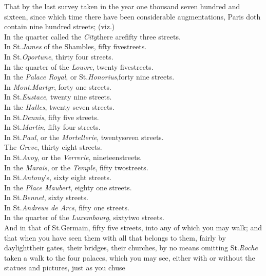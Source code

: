 \documentclass{article}
\begin{document}
\def\bnq{\break\null\quad}
That by the last survey taken in the year one thousand seven
hundred and sixteen, since which time there have been considerable
augmentations, Paris doth contain nine hundred streets;
(viz.)\\[2pt]
In the quarter called the \textit{City}\tsk there are\break\null\quad fifty three streets.\\
In St.\@ \textit{James} of the Shambles, fifty five\break\null\quad streets.\\
In St.\@ \textit{Oportune}, thirty four streets.\\
In the quarter of the \textit{Louvre}, twenty five\break\null\quad streets.\\
In the \textit{Palace Royal}, or St.\@ \textit{Honorius},\break\null\quad forty nine streets.\\
In \textit{Mont.\@ Martyr}, forty one streets.\\
In St.\@ \textit{Eustace}, twenty nine streets.\\
\newpage\noindent
In the \textit{Halles}, twenty seven streets.\\
In St.\@ \textit{Dennis}, fifty five streets.\\
In St.\@ \textit{Martin}, fifty four streets.\\
In St.\@ \textit{Paul}, or the \textit{Mortellerie}, twenty\bnq seven streets.\\
The \textit{Greve}, thirty eight streets.\\
In St.\@ \textit{Avoy}, or the \textit{Verrerie}, nineteen\bnq streets.\\
In the \textit{Marais}, or the \textit{Temple}, fifty two\bnq streets.\\
In St.\@ \textit{Antony}’s, sixty eight streets.\\
In the \textit{Place Maubert}, eighty one streets.\\
In St.\@ \textit{Bennet}, sixty streets.\\
In St.\@ \textit{Andrews de Arcs}, fifty one streets.\\
In the quarter of the \textit{Luxembourg}, sixty\bnq two streets.\\[2pt]
And in that of St.\@ Germain, fifty five streets, into any of
which you may walk; and that when you have seen them with all that
belongs to them, fairly by daylight\tsk their gates, their
bridges, their \break
{}\break
churches, by no means omitting
St.\@ \textit{Roche}\break
{}
taken a walk to the four palaces, which you may see, either with or
without the statues and pictures, just as you chuse\tsk
\end{document}
